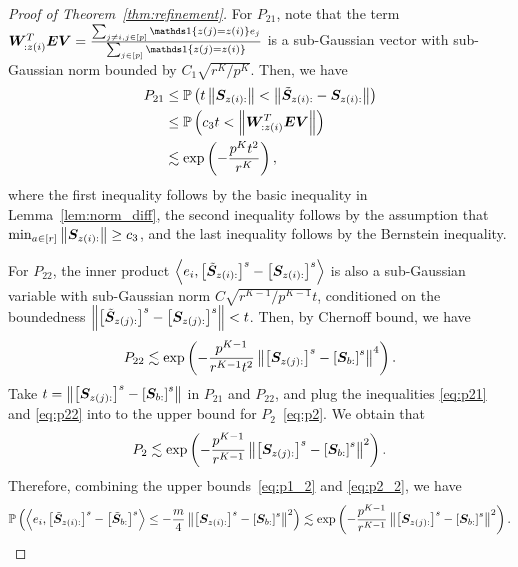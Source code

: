 \documentclass[lettersize,onecolumn,journal]{IEEEtran}
\theoremstyle{definition}
\theoremstyle{definition}
\newcommand{\of}[1]{\left(#1\right)}
\newcommand{\off}[1]{\left[#1\right]}
\newcommand{\ang}[1]{\left\langle#1\right\rangle}
\begin{document}
\begin{proof}[Proof of Theorem~\ref{thm:refinement}]
    For $P_{21}$, note that the term $\mW^T_{: z(i)} \mE \mV = \frac{ \sum_{ j \neq i, j \in [p]} \ind \{ z(j) = z(i) \} e_j }{\sum_{j \in [p]} \ind \{ z(j) = z(i) \} }$  is a sub-Gaussian vector with sub-Gaussian norm bounded by $C_1 \sqrt{r^K/ p^K}$. Then, we have 
    \begin{align}
        P_{21} &\leq \bbP\of{ t \onorm{\mS_{z(i):} } < \onorm{ \tilde  \mS_{z(i):}  -  \mS_{z(i):} }  }\\
        & \leq \bbP\of{c_3 t <   \onorm{ \mW^T_{: z(i)} \mE \mV  } } \\
        & \lesssim \exp\of{ - \frac{p^K t^2}{r^K} }, \label{eq:p21}
    \end{align}
    where the first inequality follows by the basic inequality in Lemma~\ref{lem:norm_diff}, the second inequality follows by the assumption that $ \min_{a \in [r]} \left\lVert\bm S_{z(i):}\right\rVert \geq c_3$, and the last inequality follows by the Bernstein inequality.
    
    For $P_{22}$, the inner product $ \ang{e_i, \off{ \tilde  \mS_{z(i):} }^s - \off{ \mS_{z(i):} }^s}$ is also a sub-Gaussian variable with sub-Gaussian norm $ C \sqrt{ r^{K-1}/ p^{K-1} } t$, conditioned on the boundedness $\onorm{ \off{ \tilde  \mS_{z(j):} }^s - \off{ \mS_{z(j):} }^s } < t$. Then, by Chernoff bound, we have 
    \begin{equation}\label{eq:p22}
        P_{22} \lesssim \exp \of{  - \frac{p^{K-1}}{r^{K-1} t^2}   \onorm{ \off{ \mS_{z(j):}  }^s - \off{ \mS_{b:}  }^s  }^4 }. 
    \end{equation}
    Take $t =  \onorm{ \off{ \mS_{z(j):}  }^s - \off{ \mS_{b:}  }^s  }$ in $P_{21}$ and $P_{22}$, and plug the inequalities \eqref{eq:p21} and \eqref{eq:p22} into to the upper bound for $P_2$~\eqref{eq:p2}. We obtain that 
    \begin{equation}\label{eq:p2_2}
        P_2 \lesssim \exp \of{  - \frac{p^{K-1}}{r^{K-1}}   \onorm{ \off{ \mS_{z(j):}  }^s - \off{ \mS_{b:}  }^s  }^2 }.
    \end{equation}
    Therefore, combining the upper bounds~\eqref{eq:p1_2} and \eqref{eq:p2_2}, we have 
    \begin{equation}\label{eq:xi_p}
          \bbP \of{ \ang{ e_i, \off{  \tilde \mS_{z(i):} }^s - \off{  \tilde \mS_{b:} }^s }  \leq - \frac{ m}{4} \onorm{ \off{ \mS_{z(i):}  }^s - \off{ \mS_{b:}  }^s  }^2} \lesssim  \exp \of{  - \frac{p^{K-1}}{r^{K-1}}   \onorm{ \off{ \mS_{z(j):}  }^s - \off{ \mS_{b:}  }^s  }^2 }.
    \end{equation}
    

\end{proof}
\end{document}
